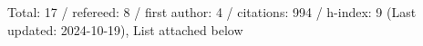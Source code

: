 Total: 17 / refereed: 8 / first author: 4 / citations: 994 / h-index: 9 (Last updated: 2024-10-19), List attached below